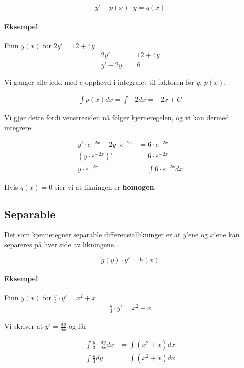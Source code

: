 \documentclass[12pt,norsk,a4paper]{article}
\begin{document}
\begin{equation}
y' + p(x) \cdot y = q(x)
\end{equation}

\paragraph*{Eksempel} Finn $y(x)$ for $2y' = 12 + 4y$
\begin{align*}
2y' &= 12 + 4y	\\
y' - 2y &= 6
\end{align*}

Vi ganger alle ledd med $e$ opphøyd i integralet til faktoren før $y$, $p(x)$.

\begin{align*}
\int p(x) dx = \int -2 dx = -2x + C
\end{align*}

Vi gjør dette fordi venstresiden nå følger kjerneregelen, og vi kan dermed integrere.

\begin{align*}
y' \cdot e^{-2x} - 2y \cdot e^{-2x} &= 6 \cdot e^{-2x}	\\
(y \cdot e^{-2x})' &= 6 \cdot e^{-2x}					\\
y \cdot e^{-2x} &= \int 6 \cdot e^{-2x} dx
\end{align*}

Hvis $q(x) = 0$ sier vi at likningen er \textbf{homogen}.

\newpage

\subsection{Separable}
Det som kjennetegner separable differensiallikninger er at $y$'ene og $x$'ene kan separeres på hver side av likningene.

\begin{equation}
g(y) \cdot y' = h(x)
\end{equation}

\paragraph*{Eksempel} Finn $y(x)$ for $\frac{y}{3} \cdot y' = x^2 + x$
\begin{align*}
\frac{y}{3} \cdot y' = x^2 + x
\end{align*}

Vi skriver at $y' = \frac{dy}{dx}$ og får

\begin{align*}
\int \frac{y}{3} \cdot \frac{dy}{dx} dx &= \int (x^2 + x)dx	\\
\int \frac{y}{3} dy &= \int (x^2 + x)dx
\end{align*}
\end{document}
